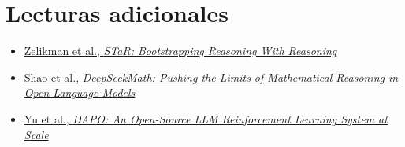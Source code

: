 \section{Lecturas adicionales}

\begin{itemize}
    \item \href{https://arxiv.org/abs/2203.14465}{Zelikman et al., \emph{STaR: Bootstrapping Reasoning With Reasoning}}
    \item \href{https://arxiv.org/abs/2402.03300}{Shao et al., \emph{DeepSeekMath: Pushing the Limits of Mathematical Reasoning in Open Language Models}}
    \item \href{https://arxiv.org/abs/2503.14476}{Yu et al., \emph{DAPO: An Open-Source LLM Reinforcement Learning System at Scale}}
\end{itemize}

